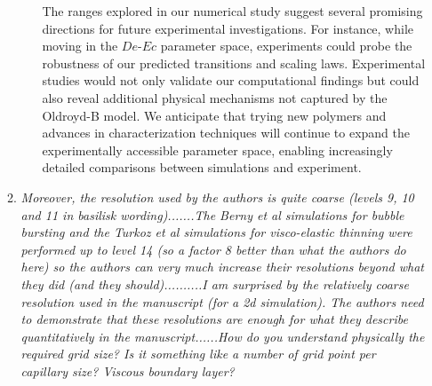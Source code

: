\documentclass[]{article}
\newcommand{\vsy}[1]{\todo[color=orange, bordercolor=none, textcolor=white]{Vatsal}\textcolor{orange}{#1}}
\newcommand{\bb}{\color{black} \normalfont}
\begin{document}
\begin{enumerate}
\begin{enumerate}
\begin{itemize}
        The ranges explored in our numerical study suggest several promising directions for future experimental investigations. For instance, while moving in the $De$-$Ec$ parameter space, experiments could probe the robustness of our predicted transitions and scaling laws. Experimental studies would not only validate our computational findings but could also reveal additional physical mechanisms not captured by the Oldroyd-B model. We anticipate that trying new polymers and advances in characterization techniques \citep{gaillard2024beware} will continue to expand the experimentally accessible parameter space, enabling increasingly detailed comparisons between simulations and experiment.
        \bb
     \end{itemize}

        \item \textit{Moreover, the resolution used by the authors is quite coarse (levels 9, 10 and 11 in basilisk wording).......The Berny et al simulations for bubble bursting and the Turkoz et al simulations for visco-elastic thinning were performed up to level 14 (so a factor 8 better than what the authors do here) so the authors can very much increase their resolutions beyond what they did (and they should)..........I am surprised by the relatively coarse resolution used in the manuscript (for a 2d simulation). The authors need to demonstrate that these resolutions are enough for what they describe quantitatively in the manuscript......How do you understand physically the required grid size? Is it something like a number of grid point per capillary size? Viscous boundary layer?}



\end{enumerate}
\end{enumerate}
\end{document}
